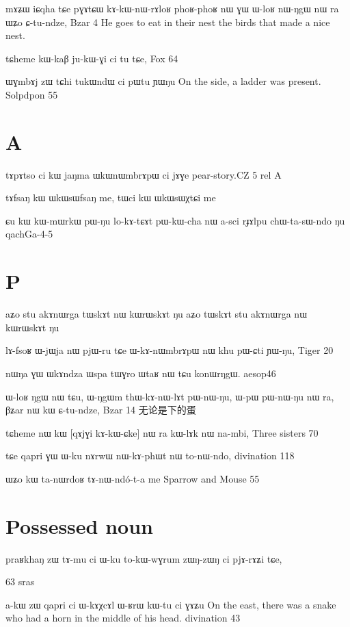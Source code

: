 \documentclass[oldfontcommands,oneside,a4paper,11pt]{memoir}
\newcommand{\wav}[1]{}%
\begin{document}
mɤʑɯ	iɕqha	tɕe	pɣɤtɕɯ	kɤ-kɯ-nɯ-rɤloʁ	phoʁ-phoʁ	nɯ	ɣɯ	ɯ-loʁ	nɯ-ŋgɯ	nɯ	ra	ɯʑo	ɕ-tu-ndze,
Bzar 4
He goes to eat in their nest the birds that made a nice nest.

tɕheme	kɯ-kaβ	ju-kɯ-ɣi	ci	tu	tɕe,
Fox 64

ɯɣmbɤj zɯ tɕhi tukɯndɯ ci pɯtu ɲɯŋu
On the side, a ladder was present.
Solpdpon 55



\section{A}
tɤpɤtso ci kɯ jaŋma ɯkɯnɯmbrɤpɯ ci jɤɣe
pear-story.CZ 5 rel A

tɤfsaŋ kɯ ɯkɯsɯfsaŋ me, tɯci kɯ ɯkɯsɯχtɕi me


ɕu	kɯ	kɯ-mɯrkɯ	pɯ-ŋu	lo-kɤ-tɕɤt	pɯ-kɯ-cha	nɯ a-sci	rɟɤlpu	chɯ-ta-sɯ-ndo	ŋu
qachGa-4-5




\section{P}

aʑo stu akɤnɯrga tɯskɤt nɯ kɯrɯskɤt ŋu
aʑo tɯskɤt stu akɤnɯrga nɯ kɯrɯskɤt ŋu
\wav{gram-akAnWrga}



	lɤ-fsoʁ ɯ-jɯja nɯ pjɯ-ru tɕe ɯ-kɤ-nɯmbrɤpɯ nɯ khu pɯ-ɕti ɲɯ-ŋu,
Tiger 20



nɯŋa ɣɯ ɯkɤndza ɯspa tɯɣro ɯtaʁ nɯ tɕu konɯrŋgɯ. 
aesop46

ɯ-loʁ	ŋgɯ	nɯ	tɕu,	ɯ-ŋgɯm	thɯ-kɤ-nɯ-lɤt	pɯ-nɯ-ŋu, ɯ-pɯ	pɯ-nɯ-ŋu	nɯ	ra,	βʑar	nɯ	kɯ	ɕ-tu-ndze,
Bzar 14 无论是下的蛋

tɕheme	nɯ	kɯ	[qɤjɣi	kɤ-kɯ-ɕke]	nɯ	ra	kɯ-lɤk	nɯ	na-mbi,
Three sisters 70

tɕe	qapri	ɣɯ	ɯ-ku	nɤrwɯ	nɯ-kɤ-phɯt	nɯ	to-nɯ-ndo,
divination 118

ɯʑo kɯ ta-nɯrdoʁ tɤ-nɯ-ndó-t-a me
Sparrow and Mouse 55
 
\section{Possessed noun}
praʁkhaŋ zɯ tɤ-mu ci ɯ-ku to-kɯ-wɣrum zɯŋ-zɯŋ ci pjɤ-rɤʑi tɕe,

63 sras


a-kɯ zɯ qapri ci ɯ-kɤχcɤl ɯ-ʁrɯ kɯ-tu ci ɣɤʑu 
On the east, there was a snake who had a horn in the middle of his head.
divination 43
\end{document}
